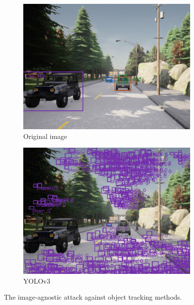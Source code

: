 \begin{figure}[H]
    \centering
    \begin{subfigure}[b]{0.48\textwidth}
        \centering
        \includegraphics[width=\linewidth]{figures/chapter_tracking/yolov3_uap_origin.png}
        \caption{Original image}
        \label{fig:tracking_attack_origin} 
    \end{subfigure}
    \begin{subfigure}[b]{0.48\textwidth}
        \centering
        \includegraphics[width=\linewidth]{figures/chapter_tracking/yolov3_uap_attack.png}
        \caption{YOLOv3}
        \label{fig:tracking_uap_attack}
    \end{subfigure}
  \caption{The image-agnostic attack against object tracking methods.}
  \label{fig:tracking_attack_uap}
\end{figure}


